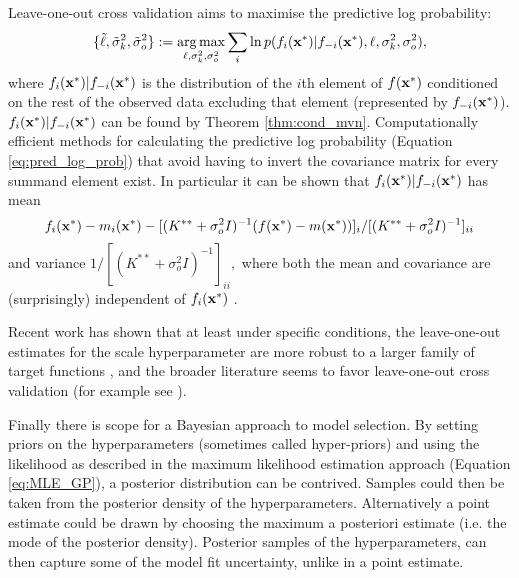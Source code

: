 Leave-one-out cross validation aims to maximise the predictive log
probability:
\begin{align}
        \{\tilde{\ell}, \tilde{\sigma}^2_k, \tilde{\sigma}^2_o\}
        := \operatorname*{arg\,max}_{\ell, \sigma^2_k, \sigma^2_o} \sum_{i}
        \ln p(f_i(\mathbf{x}^\ast) | f_{-i}(\mathbf{x}^\ast), \ell, \sigma^2_k, \sigma^2_o),
        \label{eq:pred_log_prob}
\end{align}
where $f_i(\mathbf{x}^\ast) | f_{-i}(\mathbf{x}^\ast)$ is the distribution of the
$i$th element of $f(\mathbf{x}^\ast)$ conditioned on the rest of the
observed data excluding that element (represented by $f_{-i}(\mathbf{x}^\ast)$).
$f_i(\mathbf{x}^\ast) | f_{-i}(\mathbf{x}^\ast)$ can be found by
Theorem \ref{thm:cond_mvn}. Computationally efficient methods for calculating
the predictive log probability (Equation \ref{eq:pred_log_prob}) 
that avoid having to invert the covariance
matrix for every summand element exist. In particular it can be shown that
$f_i(\mathbf{x}^\ast) | f_{-i}(\mathbf{x}^\ast)$ has mean
$$
    f_i(\mathbf{x}^\ast) - m_i(\mathbf{x}^\ast)
    - [(K^{**} + \sigma^2_o I)^{-1}(f(\mathbf{x}^\ast) - m(\mathbf{x}^\ast))]_i
    /[(K^{**} + \sigma^2_o I)^{-1}]_{ii}
$$
and variance $1/[(K^{**} + \sigma^2_o I)^{-1}]_{ii},$ where both the mean and
covariance are (surprisingly) independent of $f_i(\mathbf{x}^\ast)$
\parencite[116]{rasmussen_gaussian_2008}.

Recent work has shown that at least under specific conditions, the
leave-one-out estimates for the scale hyperparameter are more robust to a larger
family of target functions \parencite{naslidnyk_comparing_2024}, and the
broader literature seems to favor leave-one-out cross validation (for example
see \cite{gutmann_bayesian_2016}).

Finally there is scope for a Bayesian approach to model selection. By setting
priors on the hyperparameters (sometimes called hyper-priors)
and using the likelihood as described
in the maximum likelihood estimation approach (Equation \ref{eq:MLE_GP}), 
a posterior distribution can be
contrived. Samples could then be taken from the posterior density
of the hyperparameters. Alternatively a point estimate could be drawn by
choosing the maximum a posteriori estimate (i.e. the mode of the
posterior density). Posterior
samples of the hyperparameters, can then capture some of the model fit 
uncertainty, unlike in a point estimate.


